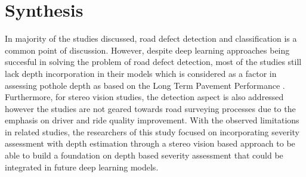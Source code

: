 \section{Synthesis}
In majority of the studies discussed, road defect detection and classification is a common point of discussion. However, despite deep learning approaches being succesful in solving the problem of road defect detection, most of the studies still lack depth incorporation in their models which is considered as a factor in assessing pothole depth as based on the Long Term Pavement Performance \cite{miller2014}. Furthermore, for stereo vision studies, the detection aspect is also addressed however the studies are not geared towards road surveying processes due to the emphasis on driver and ride quality improvement. With the observed limitations in related studies, the researchers of this study focused on incorporating severity assessment with depth estimation through a stereo vision based approach to be able to build a foundation on depth based severity assessment that could be integrated in future deep learning models.

\newpage
